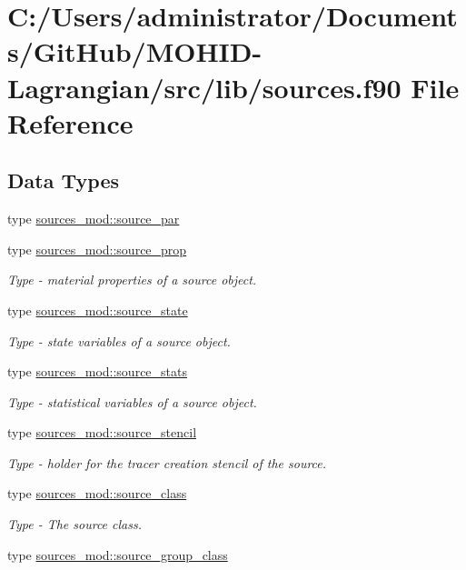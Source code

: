 \hypertarget{sources_8f90}{}\section{C\+:/\+Users/administrator/\+Documents/\+Git\+Hub/\+M\+O\+H\+I\+D-\/\+Lagrangian/src/lib/sources.f90 File Reference}
\label{sources_8f90}
\subsection*{Data Types}
\begin{DoxyCompactItemize}
\item 
type \mbox{\hyperlink{structsources__mod_1_1source__par}{sources\+\_\+mod\+::source\+\_\+par}}
\item 
type \mbox{\hyperlink{structsources__mod_1_1source__prop}{sources\+\_\+mod\+::source\+\_\+prop}}
\begin{DoxyCompactList}\small\item\em Type -\/ material properties of a source object. \end{DoxyCompactList}\item 
type \mbox{\hyperlink{structsources__mod_1_1source__state}{sources\+\_\+mod\+::source\+\_\+state}}
\begin{DoxyCompactList}\small\item\em Type -\/ state variables of a source object. \end{DoxyCompactList}\item 
type \mbox{\hyperlink{structsources__mod_1_1source__stats}{sources\+\_\+mod\+::source\+\_\+stats}}
\begin{DoxyCompactList}\small\item\em Type -\/ statistical variables of a source object. \end{DoxyCompactList}\item 
type \mbox{\hyperlink{structsources__mod_1_1source__stencil}{sources\+\_\+mod\+::source\+\_\+stencil}}
\begin{DoxyCompactList}\small\item\em Type -\/ holder for the tracer creation stencil of the source. \end{DoxyCompactList}\item 
type \mbox{\hyperlink{structsources__mod_1_1source__class}{sources\+\_\+mod\+::source\+\_\+class}}
\begin{DoxyCompactList}\small\item\em Type -\/ The source class. \end{DoxyCompactList}\item 
type \mbox{\hyperlink{structsources__mod_1_1source__group__class}{sources\+\_\+mod\+::source\+\_\+group\+\_\+class}}
\end{DoxyCompactItemize}
